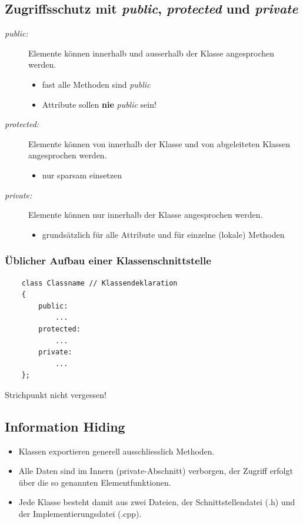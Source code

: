 \begin{multicols}{2}
\subsection{Zugriffsschutz mit \emph{public}, \emph{protected} und \emph{private}}
\begin{description}
	\item [\emph{public:}] Elemente können innerhalb und ausserhalb der Klasse angesprochen werden.
	\begin{itemize}
		\item fast alle Methoden sind \emph{public}
		\item Attribute sollen \textbf{nie} \emph{public} sein!
	\end{itemize}
	\item [\emph{protected:}] Elemente können von innerhalb der Klasse und von abgeleiteten Klassen angesprochen werden.
	\begin{itemize}
		\item nur sparsam einsetzen
	\end{itemize}
	\item [\emph{private:}] Elemente können nur innerhalb der Klasse angesprochen werden.
	\begin{itemize}
		\item grundsätzlich für alle Attribute und für einzelne (lokale) Methoden
	\end{itemize}
\end{description}
\vfill\null
\columnbreak
\subsubsection{Üblicher Aufbau einer Klassenschnittstelle}
\vspace{-\baselineskip}
\begin{minipage}{\linewidth}
	\begin{lstlisting}
	class Classname	// Klassendeklaration
	{
		public:
			...
		protected:
			...
		private:
			...
	};
	\end{lstlisting}
\end{minipage}
\begin{achtung}
	Strichpunkt nicht vergessen!
\end{achtung}
\end{multicols}

\subsection{Information Hiding}
\begin{itemize}
	\item Klassen exportieren generell ausschliesslich Methoden.
	\item[\-] Alle Daten sind im Innern (private-Abschnitt) verborgen, der Zugriff erfolgt über die so genannten Elementfunktionen.
	\item Jede Klasse besteht damit aus zwei Dateien, der Schnittstellendatei (.h) und der Implementierungsdatei (.cpp).
\end{itemize}
\clearpage

